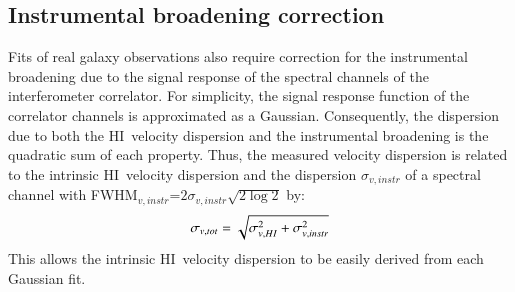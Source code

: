 \documentclass[traditabstract]{aa} %
\newcommand\HI{H{\small I}}
\begin{document}
\subsection{Instrumental broadening correction}
\label{sec:instru-broad-corr}

Fits of real galaxy observations also require correction for the 
instrumental broadening due to the signal response
of the spectral channels of the interferometer correlator.  For
simplicity, the signal response function of the correlator channels is
approximated as a Gaussian. Consequently, the dispersion due to both 
the \HI\ velocity dispersion and the instrumental broadening is the 
quadratic sum
of each property. Thus, the measured velocity
dispersion is related to the intrinsic \HI\ velocity dispersion and the
dispersion $\sigma_{v,instr}$ of a spectral channel with 
FWHM$_{v,instr}$=$2 \sigma_{v,instr} \sqrt{2 \log 2 }$ by:
\begin{equation}
  \label{eq:ch4-tot-disp}
  \sigma_{v,tot} = \sqrt{ \sigma_{v,\HI}^2 + \sigma_{v,instr}^2 }
\label{eq:ch4-instr-broadening-corr}
\end{equation}
This allows the intrinsic \HI\ velocity dispersion to be easily
derived from each Gaussian fit.
\end{document}
